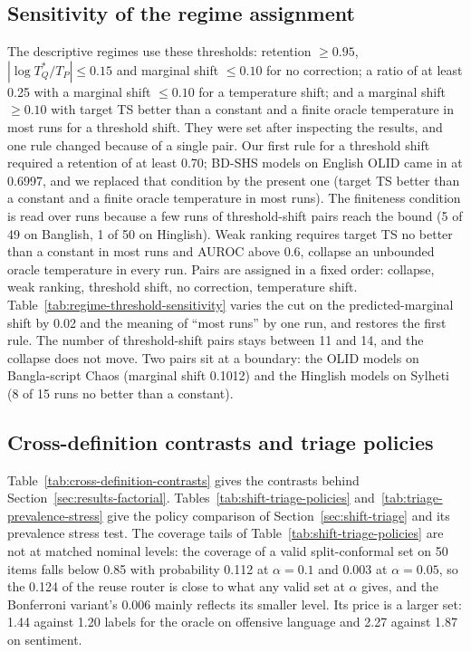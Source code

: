 \subsection{Sensitivity of the regime assignment}
\label{sec:appendix-regime-sensitivity}
The descriptive regimes use these thresholds: retention $\ge 0.95$, $|\log T^*_Q/T_P| \le 0.15$ and marginal shift
$\le 0.10$ for no correction; a ratio of at least 0.25 with a marginal shift $\le 0.10$ for a temperature shift; and a
marginal shift $\ge 0.10$ with target TS better than a constant and a finite oracle temperature in most runs for a
threshold shift. They were set after inspecting the results, and one rule changed because of a single pair. Our first rule for a threshold shift required a retention of at least 0.70; BD-SHS models on English
OLID came in at 0.6997, and we replaced that condition by the present one (target TS better than a constant and a finite
oracle temperature in most runs). The finiteness condition is read over runs because a few runs of threshold-shift pairs
reach the bound (5 of 49 on Banglish, 1 of 50 on Hinglish). Weak ranking requires target TS no better than a constant in
most runs and AUROC above 0.6, collapse an unbounded oracle temperature in every run. Pairs are assigned in a fixed order:
collapse, weak ranking, threshold shift, no correction, temperature shift. Table~\ref{tab:regime-threshold-sensitivity} varies the cut on the
predicted-marginal shift by 0.02 and the meaning of ``most runs'' by one run, and restores the first rule. The number of
threshold-shift pairs stays between 11 and 14, and the collapse does not move. Two pairs sit at a boundary: the OLID
models on Bangla-script Chaos (marginal shift 0.1012) and the Hinglish models on Sylheti (8 of 15 runs no better than a
constant).



\subsection{Cross-definition contrasts and triage policies}
\label{sec:appendix-triage-tables}
Table~\ref{tab:cross-definition-contrasts} gives the contrasts behind Section~\ref{sec:results-factorial}.
Tables~\ref{tab:shift-triage-policies} and~\ref{tab:triage-prevalence-stress} give the policy comparison of
Section~\ref{sec:shift-triage} and its prevalence stress test. The coverage tails of
Table~\ref{tab:shift-triage-policies} are not at matched nominal levels: the coverage of a valid split-conformal set on 50
items falls below 0.85 with probability 0.112 at $\alpha = 0.1$ and 0.003 at $\alpha = 0.05$, so the 0.124 of the reuse
router is close to what any valid set at $\alpha$ gives, and the Bonferroni variant's 0.006 mainly reflects its smaller
level. Its price is a larger set: 1.44 against 1.20 labels for the oracle on offensive language and 2.27 against 1.87 on
sentiment.

